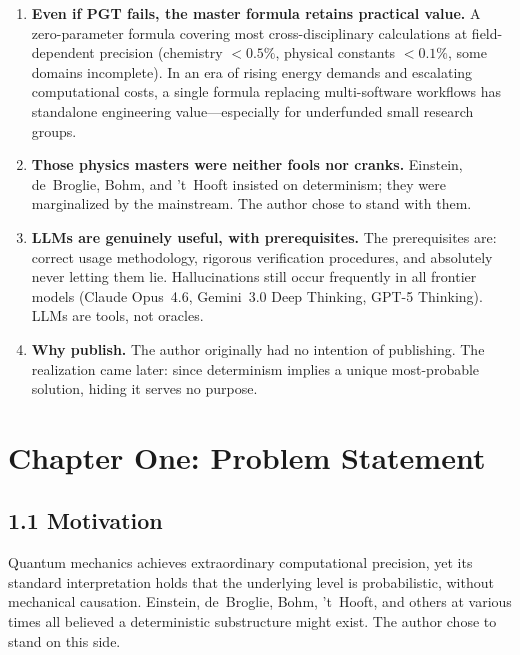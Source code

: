 \documentclass[11pt,a4paper]{article}
\begin{document}
\begin{enumerate}[leftmargin=*]
\item \textbf{Even if PGT fails, the master formula retains practical value.} A zero-parameter formula covering most cross-disciplinary calculations at field-dependent precision (chemistry $<0.5\%$, physical constants $<0.1\%$, some domains incomplete). In an era of rising energy demands and escalating computational costs, a single formula replacing multi-software workflows has standalone engineering value---especially for underfunded small research groups.

\item \textbf{Those physics masters were neither fools nor cranks.} Einstein, de~Broglie, Bohm, and 't~Hooft insisted on determinism; they were marginalized by the mainstream. The author chose to stand with them.

\item \textbf{LLMs are genuinely useful, with prerequisites.} The prerequisites are: correct usage methodology, rigorous verification procedures, and absolutely never letting them lie. Hallucinations still occur frequently in all frontier models (Claude Opus~4.6, Gemini~3.0 Deep Thinking, GPT-5 Thinking). LLMs are tools, not oracles.

\item \textbf{Why publish.} The author originally had no intention of publishing. The realization came later: since determinism implies a unique most-probable solution, hiding it serves no purpose.
\end{enumerate}

\section{Chapter One: Problem Statement}\label{sec:ch1}

\subsection{1.1 Motivation}

Quantum mechanics achieves extraordinary computational precision, yet its standard interpretation holds that the underlying level is probabilistic, without mechanical causation. Einstein, de~Broglie, Bohm, 't~Hooft, and others at various times all believed a deterministic substructure might exist. The author chose to stand on this side.
\end{document}
